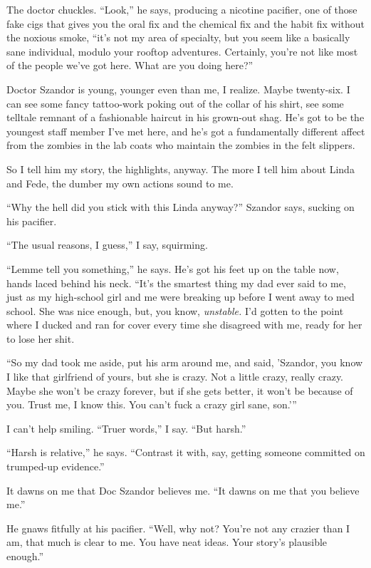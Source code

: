 The doctor chuckles. “Look,” he says, producing a nicotine
pacifier, one of those fake cigs that gives you the oral fix and
the chemical fix and the habit fix without the noxious smoke, “it’s
not my area of specialty, but you seem like a basically sane
individual, modulo your rooftop adventures. Certainly, you’re not
like most of the people we’ve got here. What are you doing here?”

Doctor Szandor is young, younger even than me, I realize. Maybe
twenty-six. I can see some fancy tattoo-work poking out of the
collar of his shirt, see some telltale remnant of a fashionable
haircut in his grown-out shag. He’s got to be the youngest staff
member I’ve met here, and he’s got a fundamentally different affect
from the zombies in the lab coats who maintain the zombies in the
felt slippers.

So I tell him my story, the highlights, anyway. The more I tell him
about Linda and Fede, the dumber my own actions sound to me.

“Why the hell did you stick with this Linda anyway?” Szandor says,
sucking on his pacifier.

“The usual reasons, I guess,” I say, squirming.

“Lemme tell you something,” he says. He’s got his feet up on the
table now, hands laced behind his neck. “It’s the smartest thing my
dad ever said to me, just as my high-school girl and me were
breaking up before I went away to med school. She was nice enough,
but, you know, \emph{unstable.} I’d gotten to the point where I
ducked and ran for cover every time she disagreed with me, ready
for her to lose her shit.

“So my dad took me aside, put his arm around me, and said,
’Szandor, you know I like that girlfriend of yours, but she is
crazy. Not a little crazy, really crazy. Maybe she won’t be crazy
forever, but if she gets better, it won’t be because of you. Trust
me, I know this. You can’t fuck a crazy girl sane, son.’”

I can’t help smiling. “Truer words,” I say. “But harsh.”

“Harsh is relative,” he says. “Contrast it with, say, getting
someone committed on trumped-up evidence.”

It dawns on me that Doc Szandor believes me. “It dawns on me that
you believe me.”

He gnaws fitfully at his pacifier. “Well, why not? You’re not any
crazier than I am, that much is clear to me. You have neat ideas.
Your story’s plausible enough.”

